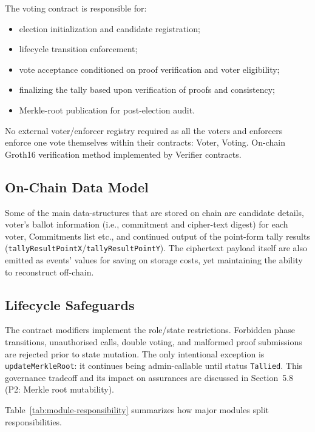 The voting contract is responsible for:
\begin{itemize}
    \item election initialization and candidate registration;
    \item lifecycle transition enforcement;
    \item vote acceptance conditioned on proof verification and voter eligibility;
    \item finalizing the tally based upon verification of proofs and consistency;
    \item Merkle-root publication for post-election audit.
\end{itemize}

No external voter/enforcer registry required as all the voters and enforcers enforce one vote themselves within their contracts: Voter, Voting. On-chain Groth16 verification method implemented by Verifier contracts.

\subsection{On-Chain Data Model}

Some of the main data-structures that are stored on chain are candidate details, voter's ballot information (i.e., commitment and cipher-text digest) for each voter, Commitments list etc., and continued output of the point-form tally results (\texttt{tallyResultPointX}/\texttt{tallyResultPointY}). The ciphertext payload itself are also emitted as events' values for saving on storage costs, yet maintaining the ability to reconstruct off-chain.

\subsection{Lifecycle Safeguards}

The contract modifiers implement the role/state restrictions. Forbidden phase transitions, unauthorised calls, double voting, and malformed proof submissions are rejected prior to state mutation. The only intentional exception is \texttt{updateMerkleRoot}: it continues being admin-callable until status \texttt{Tallied}. This governance tradeoff and its impact on assurances are discussed in Section~5.8 (P2: Merkle root mutability).

Table~\ref{tab:module-responsibility} summarizes how major modules split responsibilities.

